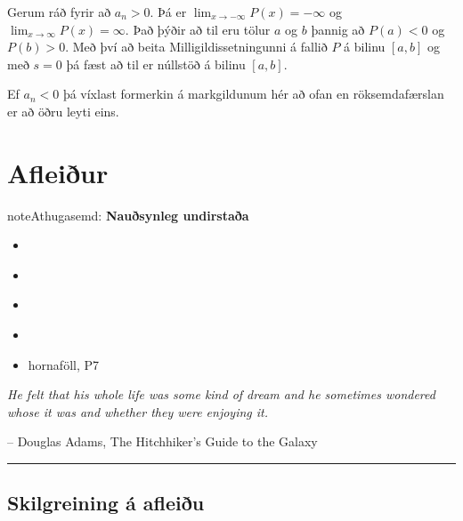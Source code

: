 \documentclass[b5paper,11pt,icelandic]{sphinxmanual}
\begin{document}
Gerum ráð fyrir að \(a_n>0\). Þá er
\(\lim_{x\to -\infty} P(x) = -\infty\) og
\(\lim_{x\to \infty} P(x) = \infty\). Það þýðir að til eru tölur
\(a\) og \(b\) þannig að \(P(a)<0\) og \(P(b)>0\). Með
því að beita Milligildissetningunni á fallið \(P\) á bilinu
\([a,b]\) og með \(s=0\) þá fæst að til er núllstöð á bilinu
\([a,b]\).

Ef \(a_n < 0\) þá víxlast formerkin á markgildunum hér að ofan en röksemdafærslan er
að öðru leyti eins.


\chapter{Afleiður}
\label{kafli03:afleiur}\label{kafli03::doc}
\begin{notice}{note}{Athugasemd:}
\textbf{Nauðsynleg undirstaða}
\begin{itemize}
\item {} 
{\hyperref[kafli02:markgildi]{}}

\item {} 
{\hyperref[kafli02:samfelldni]{}}

\item {} 
{\hyperref[kafli01:samskeyting]{}}

\item {} 
{\hyperref[kafli01:andhverfa]{}}

\item {} 
hornaföll, P7

\end{itemize}
\end{notice}

\emph{He felt that his whole life was some kind of dream and he sometimes wondered whose it was and whether they were enjoying it.}

-- Douglas Adams, The Hitchhiker's Guide to the Galaxy


\bigskip\hrule{}\bigskip



\section{Skilgreining á afleiðu}
\label{kafli03:skilgreining-a-afleiu}\label{kafli03:index-0}\label{kafli03:afleidur}
\end{document}
